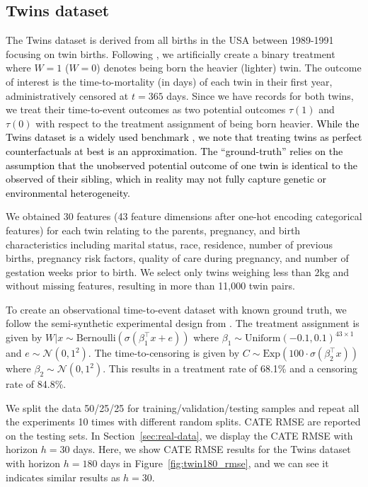\documentclass{article} %
\newcommand{\rebuttal}[1]{\textcolor{black}{#1}}
\begin{document}
\subsection{Twins dataset} \label{subapp:twin-data-additional-result}
The Twins dataset is derived from all births in the USA between 1989-1991 \citep{almond2005the} focusing on twin births. Following \citet{curth2021survite}, we artificially create a binary treatment where $W = 1$ ($W = 0$) denotes being born the heavier (lighter) twin. The outcome of interest is the time-to-mortality (in days) of each twin in their first year, administratively censored at $t = 365$ days. Since we have records for both twins, we treat their time-to-event outcomes as two potential outcomes $\tau(1)$ and $\tau(0)$ with respect to the treatment assignment of being born heavier.
\rebuttal{While the Twins dataset is a widely used benchmark \citep{louizos2017causal,du2021adversarial,curth2021survite, curth2021inductive,curth2021really}, we note that treating twins as perfect counterfactuals at best is an approximation. The “ground-truth” relies on the assumption that the unobserved potential outcome of one twin is identical to the observed of their sibling, which in reality may not fully capture genetic or environmental heterogeneity.}

We obtained 30 features (43 feature dimensions after one-hot encoding categorical features) for each twin relating to the parents, pregnancy, and birth characteristics including marital status, race, residence, number of previous births, pregnancy risk factors, quality of care during pregnancy, and number of gestation weeks prior to birth. We select only twins weighing less than 2kg and without missing features, resulting in more than 11,000 twin pairs.

To create an observational time-to-event dataset with known ground truth, we follow the semi-synthetic experimental design from \citet{curth2021survite}. The treatment assignment is given by $W|x \sim \text{Bernoulli}(\sigma(\beta_1^\top x + e))$ where $\beta_1 \sim \text{Uniform}(-0.1, 0.1)^{43 \times 1}$ and $e \sim \mathcal{N}(0, 1^2)$. The time-to-censoring is given by $C \sim \text{Exp}(100 \cdot \sigma(\beta_2^\top x))$ where $\beta_2 \sim \mathcal{N}(0, 1^2)$. This results in a treatment rate of 68.1\% and a censoring rate of 84.8\%.

We split the data 50/25/25 for training/validation/testing samples and repeat all the experiments 10 times with different random splits. CATE RMSE are reported on the testing sets.
In Section~\ref{sec:real-data}, we display the CATE RMSE with horizon $h=30$ days. Here, we show CATE RMSE results for the Twins dataset with horizon $h = 180$ days in Figure~\ref{fig:twin180_rmse}, and we can see it indicates similar results as $h=30$.
\end{document}
